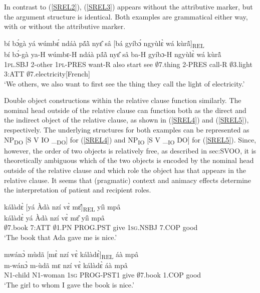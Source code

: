 \noindent In contrast to (\ref{SREL2}), (\ref{SREL3}) appears without the attributive marker, but the argument structure is identical. Both examples are grammatical either way, with or without the attributive marker.

\begin{exe} 
\ex\label{SREL3} 
  \glll  bí bɔ́gà yá wúmbɛ́ ndáà pã́ã̀ nyɛ̂ sâ [bá gyíbɔ́ ngyùlɛ̀ wá kùrã̂]\textsubscript{REL} \\
         bí bɔ́-gà ya-H wúmbɛ-H ndáà pã́ã̀ nyɛ̂ sâ ba-H gyíbɔ-H ngyùlɛ̀ wá kùrã̂ \\
          1\textsc{pl}.SBJ 2-other 1\textsc{pl}-PRES want-R also start see $\emptyset$7.thing 2-PRES call-R $\emptyset$3.light 3:ATT $\emptyset$7.electricity[French]  \\
    \trans `We others, we also want to first see the thing they call the light of electricity.'
\end{exe}

Double object constructions within the relative clause function similarly. The nominal head outside of the relative clause can function both as the direct and the indirect object of the relative clause, as shown in (\ref{SREL4}) and (\ref{SREL5}), respectively. The underlying structures for both examples can be represented as NP\textsubscript{DO} [S V IO \_\textsubscript{DO}]  for  (\ref{SREL4}) and NP\textsubscript{IO} [S V \_\textsubscript{IO} DO] for (\ref{SREL5}). 
Since, however, the order of two objects is relatively free, as described in {sec:SVOO}, it is theoretically ambiguous which of the two objects is encoded by the nominal head outside of the relative clause and which role the object has that appears in the relative clause. It seems that (pragmatic) context and animacy effects determine the interpretation of patient and recipient roles.

\begin{exe}
\ex \label{SREL4} 
  \glll kálàdɛ̀ [yá Àdà nzí vɛ̀ mɛ̂]\textsubscript{REL} yíì mpâ \\
         kálàdɛ̀ yá Àdà nzí vɛ̀ mɛ̂ yíì mpâ \\
        $\emptyset$7.book 7:ATT $\emptyset$1.PN PROG.PST give 1\textsc{sg}.NSBJ 7.COP good \\
    \trans `The book that Ada gave me is nice.'
\end{exe}

\begin{exe}
\ex \label{SREL5} 
  \glll mwánɔ̀ mùdã [mɛ̀ nzí vɛ̀ kálàdɛ̀]\textsubscript{REL} áà mpâ \\
         m-wánɔ̀ m-ùdã mɛ nzí vɛ̀ kálàdɛ̀ áà mpâ \\
         N1-child N1-woman 1\textsc{sg} PROG-PST1 give $\emptyset$7.book 1.COP good \\
    \trans `The girl to whom I gave the book is nice.'
\end{exe}



